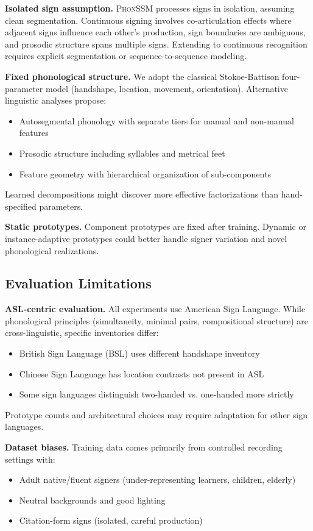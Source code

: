 \documentclass[sigconf,nonacm,anonymous]{acmart}
\theoremstyle{definition}
\theoremstyle{remark}
\newcommand{\phonssm}{\textsc{PhonSSM}}
\begin{document}
\textbf{Isolated sign assumption.} \phonssm{} processes signs in isolation, assuming clean segmentation. Continuous signing involves co-articulation effects where adjacent signs influence each other's production, sign boundaries are ambiguous, and prosodic structure spans multiple signs. Extending to continuous recognition requires explicit segmentation or sequence-to-sequence modeling.

\textbf{Fixed phonological structure.} We adopt the classical Stokoe-Battison four-parameter model (handshape, location, movement, orientation). Alternative linguistic analyses propose:
\begin{itemize}[nosep,topsep=2pt,leftmargin=*]
\item Autosegmental phonology with separate tiers for manual and non-manual features
\item Prosodic structure including syllables and metrical feet
\item Feature geometry with hierarchical organization of sub-components
\end{itemize}
Learned decompositions might discover more effective factorizations than hand-specified parameters.

\textbf{Static prototypes.} Component prototypes are fixed after training. Dynamic or instance-adaptive prototypes could better handle signer variation and novel phonological realizations.

\subsection{Evaluation Limitations}

\textbf{ASL-centric evaluation.} All experiments use American Sign Language. While phonological principles (simultaneity, minimal pairs, compositional structure) are cross-linguistic, specific inventories differ:
\begin{itemize}[nosep,topsep=2pt,leftmargin=*]
\item British Sign Language (BSL) uses different handshape inventory
\item Chinese Sign Language has location contrasts not present in ASL
\item Some sign languages distinguish two-handed vs. one-handed more strictly
\end{itemize}
Prototype counts and architectural choices may require adaptation for other sign languages.

\textbf{Dataset biases.} Training data comes primarily from controlled recording settings with:
\begin{itemize}[nosep,topsep=2pt,leftmargin=*]
\item Adult native/fluent signers (under-representing learners, children, elderly)
\item Neutral backgrounds and good lighting
\item Citation-form signs (isolated, careful production)
\end{itemize}
\end{document}
